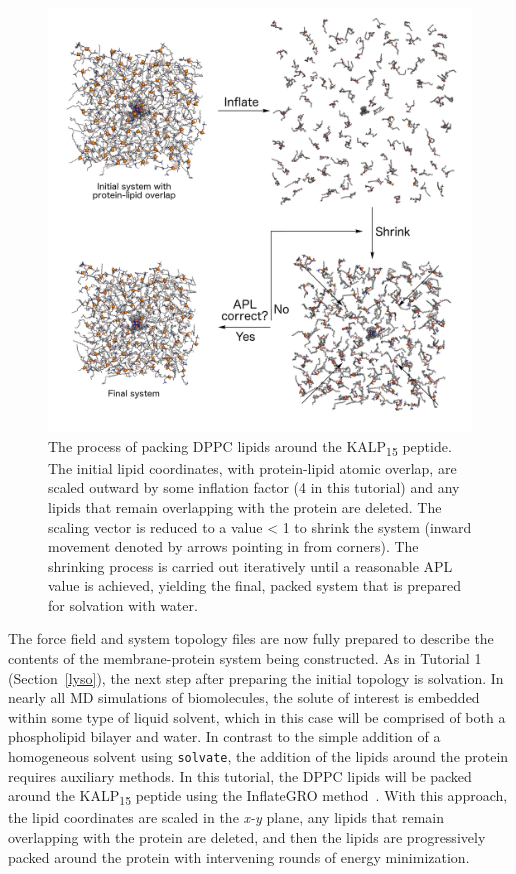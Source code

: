 \documentclass[9pt,tutorial,pubversion]{livecoms}
\begin{document}
\begin{figure}[h!]
\centering
\includegraphics{kalp_dppc_lipid_pack}
\caption{The process of packing DPPC lipids around the KALP\textsubscript{15} peptide. The initial lipid coordinates, with protein-lipid atomic overlap, are scaled outward by some inflation factor (4 in this tutorial) and any lipids that remain overlapping with the protein are deleted. The scaling vector is reduced to a value < 1 to shrink the system (inward movement denoted by arrows pointing in from corners). The shrinking process is carried out iteratively until a reasonable APL value is achieved, yielding the final, packed system that is prepared for solvation with water.}
\label{kalp_lipid_pack}
\end{figure}

The force field and system topology files are now fully prepared to describe the contents of the membrane-protein system being constructed. As in Tutorial 1 (Section~\ref{lyso}), the next step after preparing the initial topology is solvation. In nearly all MD simulations of biomolecules, the solute of interest is embedded within some type of liquid solvent, which in this case will be comprised of both a phospholipid bilayer and water. In contrast to the simple addition of a homogeneous solvent using \texttt{solvate}, the addition of the lipids around the protein requires auxiliary methods. In this tutorial, the DPPC lipids will be packed around the KALP\textsubscript{15} peptide using the InflateGRO method~\cite{Kandt2007}. With this approach, the lipid coordinates are scaled in the {\em x-y} plane, any lipids that remain overlapping with the protein are deleted, and then the lipids are progressively packed around the protein with intervening rounds of energy minimization.
\end{document}
